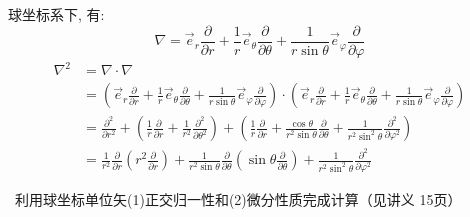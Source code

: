 \begin{frame}
	球坐标系下, 有:
	\begin{equation*}
	\nabla=\vec{e}_{r} \frac{\partial}{\partial r}+\frac{1}{r} \vec{e}_{\theta} \frac{\partial}{\partial \theta}+\frac{1}{r \sin \theta} \vec{e}_{\varphi} \frac{\partial}{\partial \varphi}
	\end{equation*}
	\begin{equation*}
	\begin{split}
		\nabla ^2&=\nabla \cdot \nabla \\
		&=(\vec{e}_{r} \frac{\partial}{\partial r}+\frac{1}{r} \vec{e}_{\theta} \frac{\partial}{\partial \theta}+\frac{1}{r \sin \theta} \vec{e}_{\varphi} \frac{\partial}{\partial \varphi})  \cdot (\vec{e}_{r} \frac{\partial}{\partial r}+\frac{1}{r} \vec{e}_{\theta} \frac{\partial}{\partial \theta}+\frac{1}{r \sin \theta} \vec{e}_{\varphi} \frac{\partial}{\partial \varphi}) \\
		&=\frac{\partial ^2}{\partial r^2} + ( \frac{1}{r} \frac{\partial}{\partial r} + \frac{1}{r^2} \frac{\partial^2} {\partial \theta ^2}  ) + (\frac{1}{r} \frac{\partial}{\partial r}  + \frac{\cos \theta}{r^2 \sin \theta} \frac{\partial} {\partial \theta }  + \frac{1}{r^2 \sin^2 \theta  } \frac{\partial^2}{\partial\varphi ^2} )\\
		&=\frac{1}{r^2} \frac{\partial }{\partial r} (r^2\frac{\partial }{\partial r} )+
		\frac{1}{r^2 \sin \theta  } \frac{\partial }{\partial \theta } (\sin \theta \frac{\partial }{\partial \theta } )
		+\frac{1}{r^2 \sin^2 \theta  } \frac{\partial^2}{\partial\varphi ^2}
	\end{split}
	\end{equation*}

	{\Bullet}~利用球坐标单位矢(1)正交归一性和(2)微分性质完成计算（见讲义 15页）
\end{frame}	

